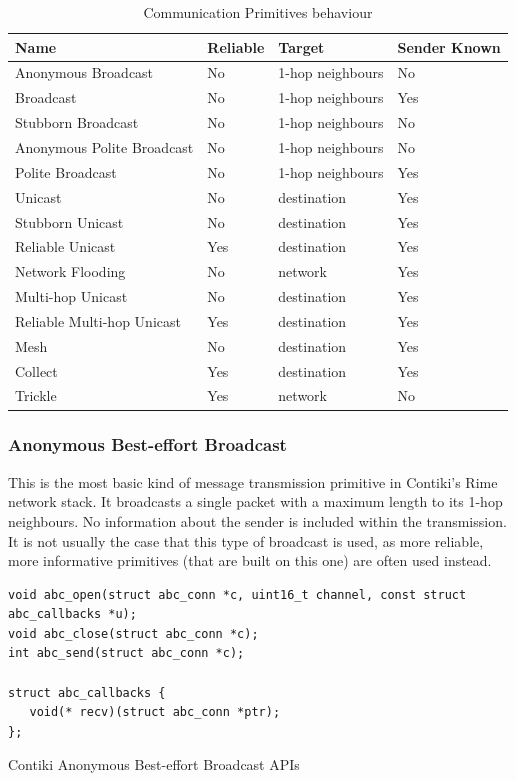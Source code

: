 \begin{table}[H]
	\centering
	\begin{tabular}{ | l | l | l | l | }
		\hline
		Name & Reliable & Target & Sender Known\\
		\hline
		Anonymous Broadcast & No & 1-hop neighbours & No\\
		Broadcast & No & 1-hop neighbours & Yes\\
		Stubborn Broadcast & No & 1-hop neighbours & No\\
		Anonymous Polite Broadcast & No & 1-hop neighbours & No\\
		Polite Broadcast & No & 1-hop neighbours & Yes\\
		Unicast & No & destination & Yes\\
		Stubborn Unicast & No & destination & Yes\\
		Reliable Unicast & Yes & destination & Yes\\
		Network Flooding & No & network & Yes\\
		Multi-hop Unicast & No & destination & Yes\\
		Reliable Multi-hop Unicast & Yes & destination & Yes\\
		\hline
		\hline
		Mesh & No & destination & Yes \\
		Collect & Yes & destination & Yes \\
		Trickle & Yes & network & No \\
		\hline
	\end{tabular}
	\caption{Communication Primitives behaviour}
\end{table}

\subsubsection{Anonymous Best-effort Broadcast}

This is the most basic kind of message transmission primitive in Contiki's Rime network stack. It broadcasts a single packet with a maximum length to its 1-hop neighbours. No information about the sender is included within the transmission. It is not usually the case that this type of broadcast is used, as more reliable, more informative primitives (that are built on this one) are often used instead.

\begin{listing}[H]
\begin{verbatim}
void abc_open(struct abc_conn *c, uint16_t channel, const struct abc_callbacks *u);
void abc_close(struct abc_conn *c);
int abc_send(struct abc_conn *c);

struct abc_callbacks {
   void(* recv)(struct abc_conn *ptr);
};
\end{verbatim}
\caption{Contiki Anonymous Best-effort Broadcast APIs}
\end{listing}

